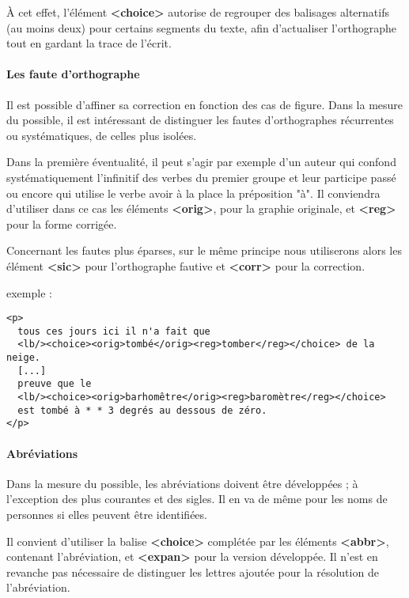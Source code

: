 \documentclass[18pt,a4paper,oneside]{book} %
\begin{document}
À cet effet, l'élément \textbf{<choice>} autorise de regrouper des balisages alternatifs (au moins deux) pour certains segments du texte, afin d'actualiser l'orthographe tout en gardant la trace de l'écrit.

\paragraph{Les faute d'orthographe}

Il est possible d'affiner sa correction en fonction des cas de figure. Dans la mesure du possible, il est intéressant de distinguer les fautes d'orthographes récurrentes ou systématiques, de celles plus isolées. 
\bigskip 

Dans la première éventualité, il peut s'agir par exemple d'un auteur qui confond systématiquement l'infinitif des verbes du premier groupe et leur participe passé ou encore qui utilise le verbe avoir à la place la préposition "à". Il conviendra d'utiliser dans ce cas les éléments \textbf{<orig>}, pour la graphie originale, et \textbf{<reg>} pour la forme corrigée.
\bigskip 

Concernant les fautes plus éparses, sur le même principe nous utiliserons alors les élément \textbf{<sic>} pour l'orthographe fautive et \textbf{<corr>} pour la correction.%
\bigskip 

exemple : 

\begin{lstlisting}
<p>
  tous ces jours ici il n'a fait que
  <lb/><choice><orig>tombé</orig><reg>tomber</reg></choice> de la neige.
  [...]
  preuve que le
  <lb/><choice><orig>barhomêtre</orig><reg>baromètre</reg></choice> 
  est tombé à * * 3 degrés au dessous de zéro.
</p>
\end{lstlisting}

\paragraph{Abréviations}

Dans la mesure du possible, les abréviations doivent être développées ; à l'exception des plus courantes et des sigles.
Il en va de même pour les noms de personnes si elles peuvent être identifiées. 
\bigskip 

Il convient d'utiliser la balise \textbf{<choice>} complétée par les éléments \textbf{<abbr>}, contenant l'abréviation, et \textbf{<expan>} pour la version développée. Il n'est en revanche pas nécessaire de distinguer les lettres ajoutée pour la résolution de l'abréviation.
\bigskip 
\end{document}
